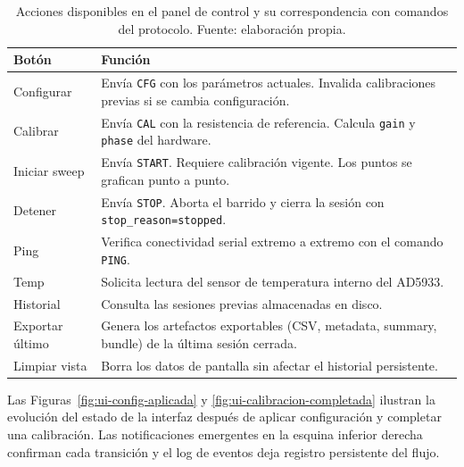 \documentclass[11pt,a4paper,spanish]{book}
\begin{document}
\begin{table}[ht]
	\centering
	\begin{tabular}{l p{9.5cm}}
		\hline\hline
		Bot\'{o}n           & Funci\'{o}n                                                                                                                       \\ [0.5ex]
		\hline
		Configurar          & Env\'{i}a \texttt{CFG} con los par\'{a}metros actuales. Invalida calibraciones previas si se cambia configuraci\'{o}n.            \\
		Calibrar            & Env\'{i}a \texttt{CAL} con la resistencia de referencia. Calcula \texttt{gain} y \texttt{phase} del hardware.                     \\
		Iniciar sweep       & Env\'{i}a \texttt{START}. Requiere calibraci\'{o}n vigente. Los puntos se grafican punto a punto.                                 \\
		Detener             & Env\'{i}a \texttt{STOP}. Aborta el barrido y cierra la sesi\'{o}n con \texttt{stop\_reason=stopped}.                              \\
		Ping                & Verifica conectividad serial extremo a extremo con el comando \texttt{PING}.                                                      \\
		Temp                & Solicita lectura del sensor de temperatura interno del AD5933.                                                                    \\
		Historial           & Consulta las sesiones previas almacenadas en disco.                                                                               \\
		Exportar \'{u}ltimo & Genera los artefactos exportables (CSV, metadata, summary, bundle) de la \'{u}ltima sesi\'{o}n cerrada.                           \\
		Limpiar vista       & Borra los datos de pantalla sin afectar el historial persistente.                                                                 \\
		\hline
	\end{tabular}
	\caption[Botones de acci\'{o}n de la UI]{Acciones disponibles en el panel de control y su correspondencia con comandos del protocolo. Fuente: elaboraci\'{o}n propia.}
	\label{tab:botones-ui}
\end{table}

Las Figuras~\ref{fig:ui-config-aplicada} y \ref{fig:ui-calibracion-completada} ilustran la evoluci\'{o}n del estado de la interfaz despu\'{e}s de aplicar configuraci\'{o}n y completar una calibraci\'{o}n. Las notificaciones emergentes en la esquina inferior derecha confirman cada transici\'{o}n y el log de eventos deja registro persistente del flujo.
\end{document}
